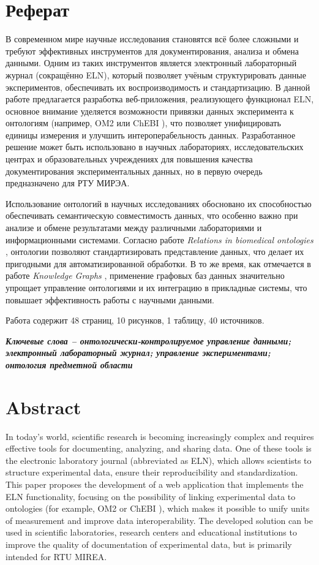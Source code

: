\section*{\centering Реферат}
В современном мире научные исследования становятся всё более сложными и требуют эффективных инструментов для документирования, анализа и обмена данными. Одним из таких инструментов является электронный лабораторный журнал (сокращённо ELN), который позволяет учёным структурировать данные экспериментов, обеспечивать их воспроизводимость и стандартизацию. В данной работе предлагается разработка веб-приложения, реализующего функционал ELN, основное внимание уделяется возможности привязки данных эксперимента к онтологиям (например, OM2 \cite{ontology:OM2} или ChEBI \cite{ontology:СhEBI}), что позволяет унифицировать единицы измерения и улучшить интероперабельность данных. Разработанное решение может быть использовано в научных лабораториях, исследовательских центрах и образовательных учреждениях для повышения качества документирования экспериментальных данных, но в первую очередь предназначено для РТУ МИРЭА.

Использование онтологий в научных исследованиях обосновано их способностью обеспечивать семантическую совместимость данных, что особенно важно при анализе и обмене результатами между различными лабораториями и информационными системами. Согласно работе \textit{Relations in biomedical ontologies} \cite{ontology:base1}, онтологии позволяют стандартизировать представление данных, что делает их пригодными для автоматизированной обработки. В то же время, как отмечается в работе \textit{Knowledge Graphs} \cite{ontology:base2}, применение графовых баз данных значительно упрощает управление онтологиями и их интеграцию в прикладные системы, что повышает эффективность работы с научными данными.

Работа содержит 48 страниц, 10 рисунков, 1 таблицу, 40 источников.

\textit{\textbf{Ключевые слова -- онтологически-контролируемое управление данными; электронный лабораторный журнал; управление экспериментами; онтология предметной области}}

\newpage

\section*{\centering Abstract}
In today's world, scientific research is becoming increasingly complex and requires effective tools for documenting, analyzing, and sharing data. One of these tools is the electronic laboratory journal (abbreviated as ELN), which allows scientists to structure experimental data, ensure their reproducibility and standardization. This paper proposes the development of a web application that implements the ELN functionality, focusing on the possibility of linking experimental data to ontologies (for example, OM2\cite{ontology:OM2} or ChEBI \cite{ontology:СhEBI}), which makes it possible to unify units of measurement and improve data interoperability. The developed solution can be used in scientific laboratories, research centers and educational institutions to improve the quality of documentation of experimental data, but is primarily intended for RTU MIREA.

